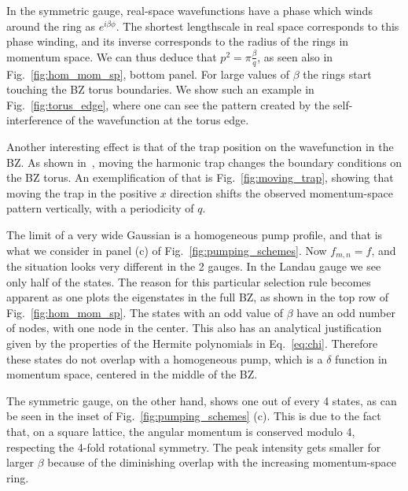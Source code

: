 \documentclass[twocolumn, 10pt, aps, superscriptaddress, floatfix, showpacs, pra, citeautoscript]{revtex4-1}
\newcommand{\co}[2]{#2}
\renewcommand{\paragraph}{\co}
\begin{document}
In the symmetric gauge, real-space wavefunctions have a phase which
winds around the ring as $e^{i\beta \phi}$. The shortest lengthscale
in real space corresponds to this phase winding, and its inverse
corresponds to the radius of the rings in momentum space. We can thus
deduce that $p^2 = \pi \frac{\beta}{q}$, as seen also in
Fig.~\ref{fig:hom_mom_sp}, bottom panel. For large values of $\beta$
the rings start touching the BZ torus boundaries. We show such an
example in Fig.~\ref{fig:torus_edge}, where one can see the pattern
created by the self-interference of the wavefunction at the torus
edge.

Another interesting effect is that of the trap position on the
wavefunction in the BZ. As shown in~\cite{ozawa2014momhh}, moving the
harmonic trap changes the boundary conditions on the BZ torus. An
exemplification of that is Fig.~\ref{fig:moving_trap}, showing that
moving the trap in the positive $x$ direction shifts the observed
momentum-space pattern vertically, with a periodicity of $q$.


\paragraph{Homogeneous spectrum can be understood using a parity argument in momentum space.}
The limit of a very wide Gaussian is a homogeneous pump profile, and
that is what we consider in panel (c) of
Fig.~\ref{fig:pumping_schemes}. Now $f_{m,n} = f$, and the situation
looks very different in the 2 gauges.  In the Landau gauge we see only
half of the states. The reason for this particular selection rule
becomes apparent as one plots the eigenstates in the full BZ, as shown
in the top row of Fig.~\ref{fig:hom_mom_sp}. The states with an odd
value of $\beta$ have an odd number of nodes, with one node in the
center. This also has an analytical justification given by the
properties of the Hermite polynomials in Eq.~\eqref{eq:chi}. Therefore
these states do not overlap with a homogeneous pump, which is a
$\delta$ function in momentum space, centered in the middle of the BZ.
%

The symmetric gauge, on the other hand, shows one out of every 4
states, as can be seen in the inset of Fig.~\ref{fig:pumping_schemes}
(c). This is due to the fact that, on a square lattice, the angular
momentum is conserved modulo 4, respecting the 4-fold rotational
symmetry. The peak intensity gets smaller for larger $\beta$ because
of the diminishing overlap with the increasing momentum-space ring.
\end{document}
